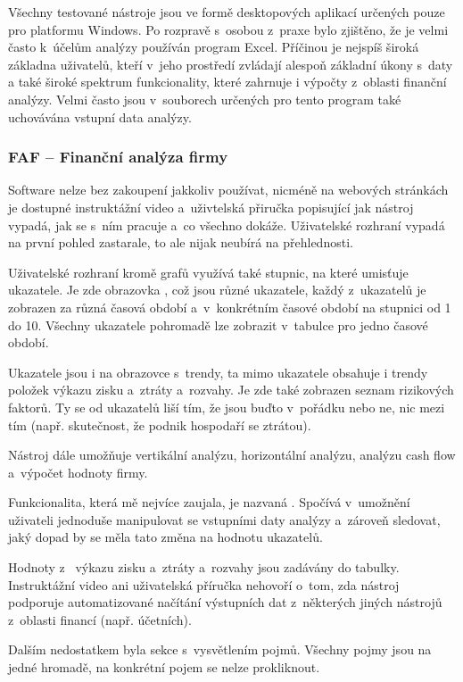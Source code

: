 Všechny testované nástroje jsou ve formě desktopových aplikací určených pouze pro platformu Windows. Po rozpravě s~osobou z~praxe bylo zjištěno, že je velmi často k~účelům analýzy používán program Excel. Příčinou je nejspíš široká základna uživatelů, kteří v~jeho prostředí zvládají alespoň základní úkony s~daty a také široké spektrum funkcionality, které zahrnuje i výpočty z~oblasti finanční analýzy. Velmi často jsou v~souborech určených pro tento program také uchovávána vstupní data analýzy.

\subsubsection{FAF -- Finanční analýza firmy}
Software nelze bez zakoupení jakkoliv používat, nicméně na webových stránkách je dostupné instruktážní video a~uživtelská přiručka popisující jak nástroj vypadá, jak se s~ním pracuje a~co všechno dokáže. Uživatelské rozhraní vypadá na první pohled zastarale, to ale nijak neubírá na přehlednosti.

Uživatelské rozhraní kromě grafů využívá také stupnic, na které umisťuje ukazatele. Je zde obrazovka , což jsou různé ukazatele, každý z~ukazatelů je zobrazen za různá časová období a~v~konkrétním časové období na stupnici od 1 do 10. Všechny ukazatele pohromadě lze zobrazit v~tabulce pro jedno časové období.

Ukazatele jsou i na obrazovce s~trendy, ta mimo ukazatele obsahuje i trendy položek výkazu zisku a~ztráty a~rozvahy. Je zde také zobrazen seznam rizikových faktorů. Ty se od ukazatelů liší tím, že jsou buďto v~pořádku nebo ne, nic mezi tím (např. skutečnost, že podnik hospodaří se ztrátou).

Nástroj dále umožňuje vertikální analýzu, horizontální analýzu, analýzu cash flow a~výpočet hodnoty firmy.

Funkcionalita, která mě nejvíce zaujala, je nazvaná . Spočívá v~umožnění uživateli jednoduše manipulovat se vstupními daty analýzy a~zároveň sledovat, jaký dopad by se měla tato změna na hodnotu ukazatelů.

Hodnoty z~ výkazu zisku a~ztráty a~rozvahy jsou zadávány do tabulky. Instruktážní video ani uživatelská příručka nehovoří o~tom, zda nástroj podporuje automatizované načítání výstupních dat z~některých jiných nástrojů z~oblasti financí (např. účetních).

Dalším nedostatkem byla sekce s~vysvětlením pojmů. Všechny pojmy jsou na jedné hromadě, na konkrétní pojem se nelze prokliknout.


